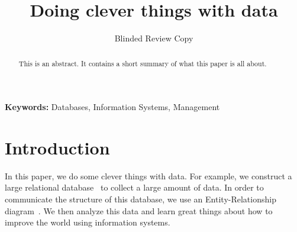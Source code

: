 \documentclass{misqdoc}
\title{Doing clever things with data}
\author{Blinded Review Copy}
\begin{document}
\maketitle

\begin{abstract}
This is an abstract. It contains a short summary of what this paper is all about.
\end{abstract}

\textbf{Keywords: } Databases, Information Systems, Management

\clearpage

\maketitle

\section{Introduction}
In this paper, we do some clever things with data. For example, we construct
a large relational database~\citep{codd1970relational} to collect a large
amount of data. In order to communicate the structure of this database, we
use an Entity-Relationship diagram~\citep{chen1976entity}. We then analyze
this data and learn great things about how to improve the world using information systems.



\end{document}

